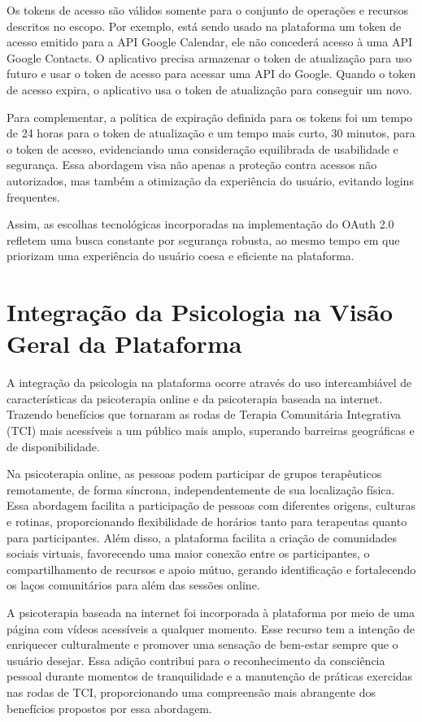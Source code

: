 Os tokens de acesso são válidos somente para o conjunto de operações e recursos descritos no escopo. Por exemplo, está sendo usado na plataforma um token de acesso emitido para a API Google Calendar, ele não concederá acesso à uma API Google Contacts. O aplicativo precisa armazenar o token de atualização para uso futuro e usar o token de acesso para acessar uma API do Google. Quando o token de acesso expira, o aplicativo usa o token de atualização para conseguir um novo.

Para complementar, a política de expiração definida para os tokens foi um tempo de 24 horas para o token de atualização e um tempo mais curto, 30 minutos, para o token de acesso, evidenciando uma consideração equilibrada de usabilidade e segurança. Essa abordagem visa não apenas a proteção contra acessos não autorizados, mas também a otimização da experiência do usuário, evitando logins frequentes.

Assim, as escolhas tecnológicas incorporadas na implementação do OAuth 2.0 refletem uma busca constante por segurança robusta, ao mesmo tempo em que priorizam uma experiência do usuário coesa e eficiente na plataforma.


\chapter{Integração da Psicologia na Visão Geral da Plataforma}

A integração da psicologia na plataforma ocorre através do uso intercambiável de características da psicoterapia online e da psicoterapia baseada na internet. Trazendo benefícios que tornaram as rodas de Terapia Comunitária Integrativa (TCI) mais acessíveis a um público mais amplo, superando barreiras geográficas e  de disponibilidade.

Na psicoterapia online, as pessoas podem participar de grupos terapêuticos remotamente, de forma síncrona, independentemente de sua localização física. Essa abordagem facilita a participação de pessoas com diferentes origens, culturas e rotinas, proporcionando flexibilidade de horários tanto para terapeutas quanto para participantes. Além disso, a plataforma facilita a criação de comunidades sociais virtuais, favorecendo uma maior conexão entre os participantes, o compartilhamento de recursos e apoio mútuo, gerando identificação e fortalecendo os laços comunitários para além das sessões online.

A psicoterapia baseada na internet foi incorporada à plataforma por meio de uma página com vídeos acessíveis a qualquer momento. Esse recurso tem a intenção de enriquecer culturalmente e promover uma sensação de bem-estar sempre que o usuário desejar. Essa adição contribui para o reconhecimento da consciência pessoal durante momentos de tranquilidade e a manutenção de práticas exercidas nas rodas de TCI, proporcionando uma compreensão mais abrangente dos benefícios propostos por essa abordagem.

